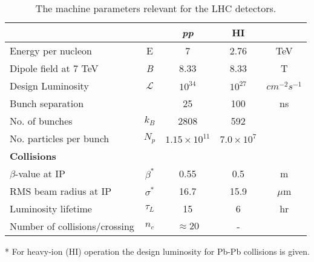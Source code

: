 \begin{table}[!htb]
  \centering
  \begin{threeparttable}
    \begin{tabular}{|lcccc|}
    \hline 
                                  &              &           \textit{pp} &         \textbf{HI} &  \\
    \hline
    Energy per nucleon            & E            &                     7 &                2.76 &             TeV \\
    Dipole field at 7 TeV         & \textit{B}   &                  8.33 &                8.33 &               T \\
    Design Luminosity\tnote{*}    & $\mathcal{L}$ &            $10^{34}$ &           $10^{27}$ & $cm^{-2}s^{-1}$ \\
    Bunch separation              &              &                    25 &                 100 &              ns \\
    No. of bunches                & $k_B$        &                  2808 &                 592 &                 \\
    No. particles per bunch       & $N_p$        & $1.15 \times 10^{11}$ & $7.0 \times 10^{7}$ &                 \\
    \hline
    \hline
    \textbf{Collisions}           &              &  &  &  \\
    \hline
    $\beta$-value at IP           & $\beta^{*}$  &                  0.55 &                 0.5 &               m \\
    RMS beam radius at IP         & $\sigma^{*}$ &                  16.7 &                15.9 &          $\mu$m \\
    Luminosity lifetime           & $\tau_L$     &                    15 &                   6 &              hr \\
    Number of collisions/crossing & $n_c$        &          $\approx 20$ &                   - &                 \\
    \hline
    \end{tabular}
    \begin{tablenotes}
      \item[*] For heavy-ion (HI) operation the design luminosity for Pb-Pb collisions is given.
    \end{tablenotes}
  \end{threeparttable}
  \caption[LHC parameters relevant for detectors]{The machine parameters relevant for the 
                                                  LHC detectors.\cite{CMSTDR:CMSPhysicsVol1}}
  \label{TABLE:ExperimentalApparatus_LHCMachineParameters}
\end{table}
